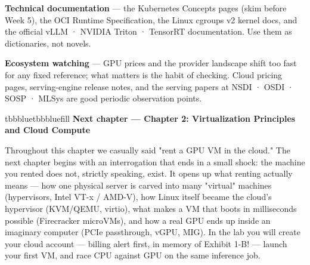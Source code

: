 \begin{tbbitemize}
  \item \textbf{Technical documentation} — the Kubernetes Concepts pages (skim before Week 5), the OCI Runtime Specification, the Linux cgroups v2 kernel docs, and the official vLLM · NVIDIA Triton · TensorRT documentation. Use them as dictionaries, not novels.
  \item \textbf{Ecosystem watching} — GPU prices and the provider landscape shift too fast for any fixed reference; what matters is the habit of checking. Cloud pricing pages, serving-engine release notes, and the serving papers at NSDI · OSDI · SOSP · MLSys are good periodic observation points.
\end{tbbitemize}

\vspace{5.0pt}

\begin{calloutbox}{tbbblue}{tbbbluefill}
{\normalsize\bfseries\color{tbbblue}Next chapter — Chapter 2: Virtualization Principles and Cloud Compute}\par\vspace{3pt}
Throughout this chapter we casually said "rent a GPU VM in the cloud." The next chapter begins with an interrogation that ends in a small shock: the machine you rented does not, strictly speaking, exist. It opens up what renting actually means — how one physical server is carved into many "virtual" machines (hypervisors, Intel VT-x / AMD-V), how Linux itself became the cloud's hypervisor (KVM/QEMU, virtio), what makes a VM that boots in milliseconds possible (Firecracker microVMs), and how a real GPU ends up inside an imaginary computer (PCIe passthrough, vGPU, MIG). In the lab you will create your cloud account — billing alert first, in memory of Exhibit 1-B! — launch your first VM, and race CPU against GPU on the same inference job.
\end{calloutbox}
